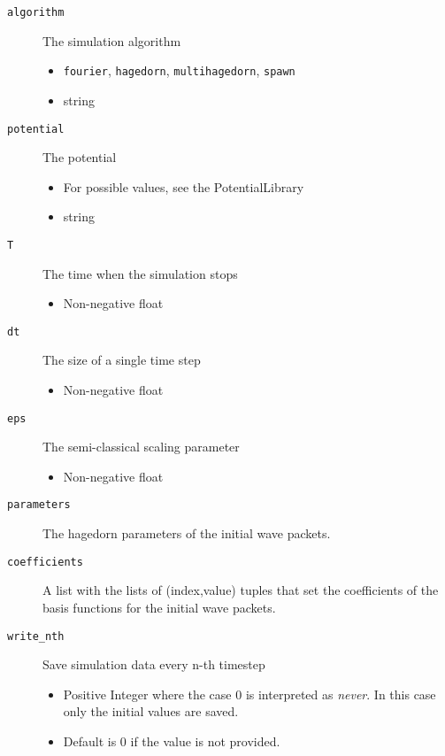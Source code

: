 \documentclass[a4paper,10pt]{report}
\begin{document}
\begin{description}
  \item[\texttt{algorithm}] The simulation algorithm
  \begin{itemize}
    \item \texttt{fourier}, \texttt{hagedorn}, \texttt{multihagedorn}, \texttt{spawn}
    \item string
  \end{itemize}

  \item[\texttt{potential}] The potential
  \begin{itemize}
    \item For possible values, see the PotentialLibrary
    \item string
  \end{itemize}

  \item[\texttt{T}] The time when the simulation stops
  \begin{itemize}
    \item Non-negative float
  \end{itemize}

  \item[\texttt{dt}] The size of a single time step
  \begin{itemize}
    \item Non-negative float
  \end{itemize}

  \item[\texttt{eps}] The semi-classical scaling parameter
  \begin{itemize}
    \item Non-negative float
  \end{itemize}

  \item[\texttt{parameters}] The hagedorn parameters of the initial wave packets.

  \item[\texttt{coefficients}] A list with the lists of (index,value) tuples that
                               set the coefficients of the basis functions for the
                               initial wave packets.

  \item[\texttt{write\_nth}] Save simulation data every n-th timestep
  \begin{itemize}
    \item Positive Integer where the case 0 is interpreted as \emph{never}. In
          this case only the initial values are saved.
    \item Default is 0 if the value is not provided.
  \end{itemize}


\end{description}
\end{document}
